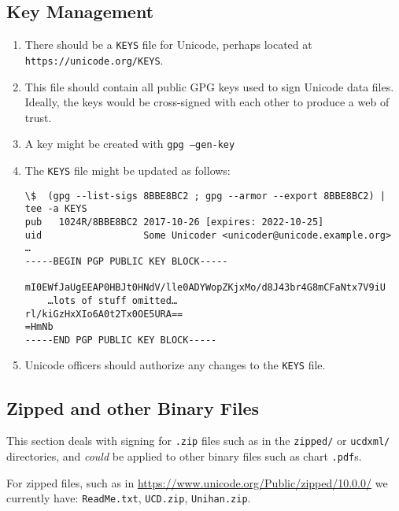 \documentclass[12pt]{article}
\begin{document}
\subsection{Key Management}

\begin{enumerate}

\item There should be a {\tt KEYS} file for Unicode, perhaps located at {\tt https://unicode.org/KEYS}.

\item This file should contain all public GPG keys used to sign Unicode data files. Ideally, the keys would be cross-signed with each other to produce a web of trust.

\item A key might be created with {\tt gpg --gen-key}

\item The {\tt KEYS}  file  might be updated as follows:

\begin{verbatim}
\$  (gpg --list-sigs 8BBE8BC2 ; gpg --armor --export 8BBE8BC2) | tee -a KEYS
pub   1024R/8BBE8BC2 2017-10-26 [expires: 2022-10-25]
uid                  Some Unicoder <unicoder@unicode.example.org>
…
-----BEGIN PGP PUBLIC KEY BLOCK-----

mI0EWfJaUgEEAP0HBJt0HNdV/lle0ADYWopZKjxMo/d8J43br4G8mCFaNtx7V9iU
    …lots of stuff omitted…
rl/kiGzHxXIo6A0t2Tx0OE5URA==
=HmNb
-----END PGP PUBLIC KEY BLOCK-----

\end{verbatim}

\item Unicode officers should authorize any changes to the {\tt KEYS} file.

\end{enumerate}

\subsection{Zipped and other Binary Files}

This section deals with signing for {\tt .zip} files such as in the {\tt zipped/} or {\tt ucdxml/} directories, and \emph{could} be applied to other binary files such as chart {\tt .pdf}s.

For zipped files, such as in \url{https://www.unicode.org/Public/zipped/10.0.0/} we currently have:  {\tt ReadMe.txt}, {\tt UCD.zip}, {\tt Unihan.zip}.
\end{document}
